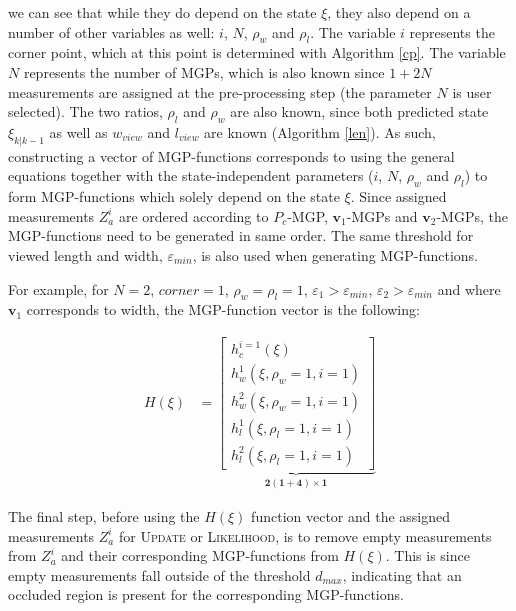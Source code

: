 we can see that while they do depend on the state $\xi$, they also depend on a number of other variables as well: $i$, $N$, $\rho_w$ and $\rho_l$. The variable $i$ represents the corner point, which at this point is determined with Algorithm \ref{cp}. The variable $N$ represents the number of MGPs, which is also known since $1 + 2N$ measurements are assigned at the pre-processing step (the parameter $N$ is user selected). The two ratios, $\rho_l$ and $\rho_w$ are also known, since both predicted state $\xi_{k|k-1}$ as well as $w_{view}$ and $l_{view}$ are known (Algorithm \ref{len}). As such, constructing a vector of MGP-functions corresponds to using the general equations together with the state-independent parameters ($i$, $N$, $\rho_w$ and $\rho_l$) to form MGP-functions which solely depend on the state $\xi$. Since assigned measurements $Z_a^i$ are ordered according to $P_c$-MGP, $\mathbf{v}_1$-MGPs and $\mathbf{v}_2$-MGPs, the MGP-functions need to be generated in same order. The same threshold for viewed length and width, $\varepsilon_{min}$, is also used when generating MGP-functions. 

For example, for $N = 2$, $corner = 1$, $\rho_w = \rho_l = 1$, $\varepsilon_1 > \varepsilon_{min}$, $\varepsilon_2 > \varepsilon_{min}$ and where $\mathbf{v}_1$ corresponds to width, the MGP-function vector is the following:

\begin{equation}
    \begin{split}
        H(\xi) &= 
        \underbrace{\begin{bmatrix}
            h_c^{i=1}(\xi) \\
            h_w^{1}(\xi, \rho_w = 1, i=1) \\
            h_w^{2}(\xi, \rho_w = 1, i=1) \\
            h_l^{1}(\xi, \rho_l = 1, i=1) \\
            h_l^{2}(\xi, \rho_l = 1, i=1)
        \end{bmatrix}}_{\mathbf{2(1+4)\times1}}
    \end{split}
\end{equation}

The final step, before using the $H(\xi)$ function vector and the assigned measurements $Z_a^i$ for \textsc{Update} or \textsc{Likelihood}, is to remove empty measurements from $Z_a^i$ and their corresponding MGP-functions from $H(\xi)$. This is since empty measurements fall outside of the threshold $d_{max}$, indicating that an occluded region is present for the corresponding MGP-functions. 

